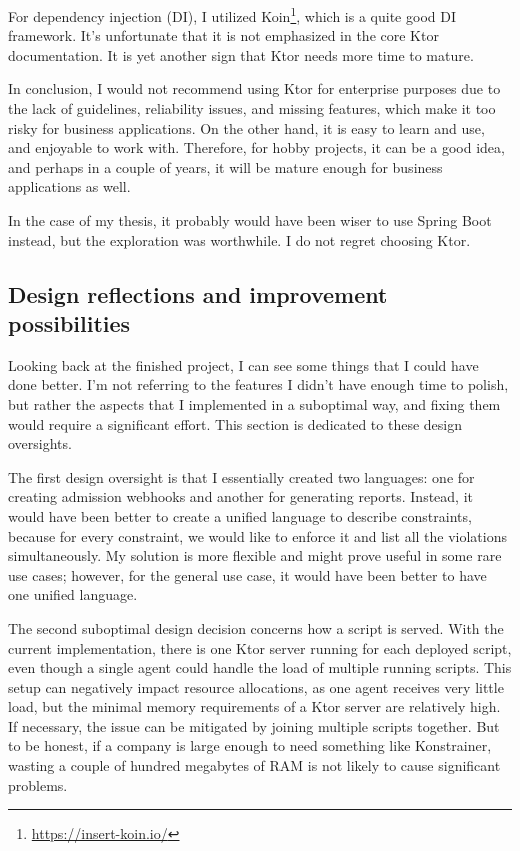 For dependency injection (DI), I utilized Koin\footnote{\url{https://insert-koin.io/}}, which is a quite good DI framework. It's unfortunate that it is not emphasized in the core Ktor documentation. It is yet another sign that Ktor needs more time to mature.

In conclusion, I would not recommend using Ktor for enterprise purposes due to the lack of guidelines, reliability issues, and missing features, which make it too risky for business applications. On the other hand, it is easy to learn and use, and enjoyable to work with. Therefore, for hobby projects, it can be a good idea, and perhaps in a couple of years, it will be mature enough for business applications as well.

In the case of my thesis, it probably would have been wiser to use Spring Boot instead, but the exploration was worthwhile. I do not regret choosing Ktor.

\clearpage
\subsection[Design Reflections]{Design reflections and improvement possibilities}

Looking back at the finished project, I can see some things that I could have done better. I'm not referring to the features I didn't have enough time to polish, but rather the aspects that I implemented in a suboptimal way, and fixing them would require a significant effort. This section is dedicated to these design oversights.

The first design oversight is that I essentially created two languages: one for creating admission webhooks and another for generating reports. Instead, it would have been better to create a unified language to describe constraints, because for every constraint, we would like to enforce it and list all the violations simultaneously. My solution is more flexible and might prove useful in some rare use cases; however, for the general use case, it would have been better to have one unified language.

The second suboptimal design decision concerns how a script is served. With the current implementation, there is one Ktor server running for each deployed script, even though a single agent could handle the load of multiple running scripts. This setup can negatively impact resource allocations, as one agent receives very little load, but the minimal memory requirements of a Ktor server are relatively high. If necessary, the issue can be mitigated by joining multiple scripts together. But to be honest, if a company is large enough to need something like Konstrainer, wasting a couple of hundred megabytes of RAM is not likely to cause significant problems.

